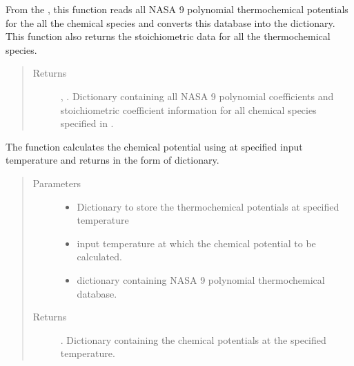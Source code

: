 \documentclass[letterpaper,10pt,english]{sphinxmanual}
\begin{document}
\begin{fulllineitems}
From the , this function reads all NASA 9 polynomial thermochemical potentials for the all the chemical species and converts this database into the dictionary. This function also returns the stoichiometric data for all the thermochemical species.
\begin{quote}\begin{description}
\item[{Returns}] \leavevmode
{}, . Dictionary containing all NASA 9 polynomial coefficients and stoichiometric coefficient information for all chemical species specified in .

\end{description}\end{quote}

\end{fulllineitems}



\begin{fulllineitems}
The function calculates the chemical potential using  at specified input temperature and returns in the form of dictionary.
\begin{quote}\begin{description}
\item[{Parameters}] \leavevmode\begin{itemize}
\item {} 
 \textendash{} Dictionary to store the thermochemical potentials at specified temperature

\item {} 
 \textendash{} input temperature at which the chemical potential to be calculated.

\item {} 
 \textendash{} dictionary containing NASA 9 polynomial thermochemical
database.

\end{itemize}

\item[{Returns}] \leavevmode
{}. Dictionary containing the chemical potentials at the specified temperature.

\end{description}\end{quote}

\end{fulllineitems}
\end{document}
